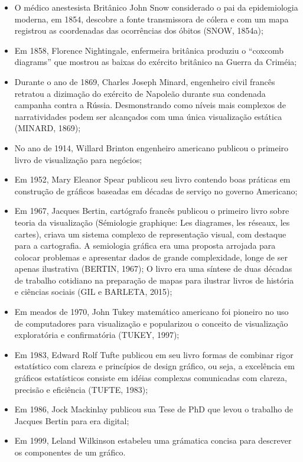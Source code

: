 \begin{itemize}
  \item O médico anestesista Britânico John Snow considerado o pai da epidemiologia moderna, em 1854, descobre a fonte transmissora de cólera e com um mapa registrou as coordenadas das ocorrências dos óbitos (SNOW, 1854a);
  \item Em 1858, Florence Nightingale, enfermeira britânica produziu o “coxcomb diagrams” que mostrou as baixas do exército britânico na Guerra da Criméia;
  \item Durante o ano de 1869, Charles Joseph Minard, engenheiro civil francês retratou a dizimação do exército de Napoleão durante sua condenada campanha contra a Rússia. Desmonstrando como níveis mais complexos de narratividades podem ser alcançados com uma única visualização estática (MINARD, 1869);
  \item No ano de 1914, Willard Brinton engenheiro americano publicou o primeiro livro de visualização para negócios;
  \item Em 1952, Mary Eleanor Spear publicou seu livro contendo boas práticas em construção de gráficos baseadas em décadas de serviço no governo Americano;
  \item Em 1967, Jacques Bertin, cartógrafo francês publicou o primeiro livro sobre teoria da visualização (Sémiologie graphique: Les diagrames, les
réseaux, les cartes), criava um sistema complexo de representação visual, com destaque para a cartografia. A semiologia gráfica era uma proposta arrojada para colocar problemas e apresentar dados de grande complexidade, longe de ser apenas ilustrativa (BERTIN, 1967); O livro era uma síntese de duas décadas de trabalho cotidiano na preparação de mapas para ilustrar livros de história e ciências sociais (GIL e BARLETA, 2015);
  \item  Em meados de 1970, John Tukey matemático americano foi pioneiro no uso de computadores para visualização e popularizou o conceito de visualização exploratória e confirmatória (TUKEY, 1997);
  \item Em 1983, Edward Rolf Tufte publicou em seu livro formas de combinar rigor estatístico com clareza e princípios de design gráfico, ou seja, a excelência em gráficos estatísticos consiste em idéias complexas comunicadas com clareza, precisão e eficiência (TUFTE, 1983);
  \item Em 1986, Jock Mackinlay publicou sua Tese de PhD que levou o trabalho de Jacques Bertin para era digital;
  \item Em 1999, Leland Wilkinson estabeleu uma grámatica concisa para
descrever os componentes de um gráfico.
\end{itemize}

